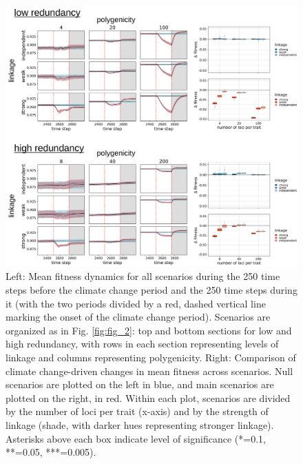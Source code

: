 \documentclass[9pt,twocolumn,twoside,lineno]{pnas-new}
\begin{document}
\begin{figure}[\sidecaptionrelwidth][t]
\centering
\includegraphics[width=17.8cm]{pub/figs/FIG_3_fit_over_time.jpg}
\caption{Left: Mean fitness dynamics for all scenarios during the 250 time steps before the climate change period and the 250 time steps during it (with the two periods divided by a red, dashed vertical line marking the onset of the climate change period). Scenarios are organized as in Fig. \ref{fig:fig_2}: top and bottom sections for low and high redundancy, with rows in each section representing levels of linkage and columns representing polygenicity. Right: Comparison of climate change-driven changes in mean fitness across scenarios. Null scenarios are plotted on the left in blue, and main scenarios are plotted on the right, in red. Within each plot, scenarios are divided by the number of loci per trait (x-axis) and by the strength of linkage (shade, with darker hues representing stronger linkage). Asterisks above each box indicate level of significance (*=0.1, **=0.05, ***=0.005).}
\label{fig:fig_3}
\end{figure}
\end{document}
